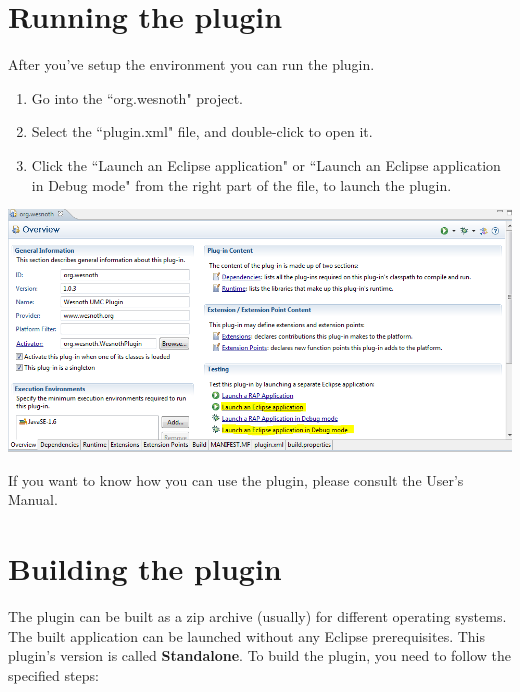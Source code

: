 \documentclass[10pt]{article}
\begin{document}
\section{Running the plugin}
After you've setup the environment you can run the plugin.
\begin{enumerate}
	\item Go into the ``org.wesnoth" project.
	\item Select the ``plugin.xml" file, and double-click to open it.
	\item Click the ``Launch an Eclipse application" or ``Launch an Eclipse application in Debug mode" from the right part of the file, to launch the plugin.
\end{enumerate}
\begin{center}
	\includegraphics[scale=0.6]{launch_plugin.png}
\end{center}

If you want to know how you can use the plugin, please consult the User's Manual.

\section{Building the plugin}
The plugin can be built as a zip archive (usually) for different operating systems. The built application can be launched without any Eclipse prerequisites. This plugin's version is called \textbf{Standalone}. To build the plugin, you need to follow the specified steps:
\end{document}
